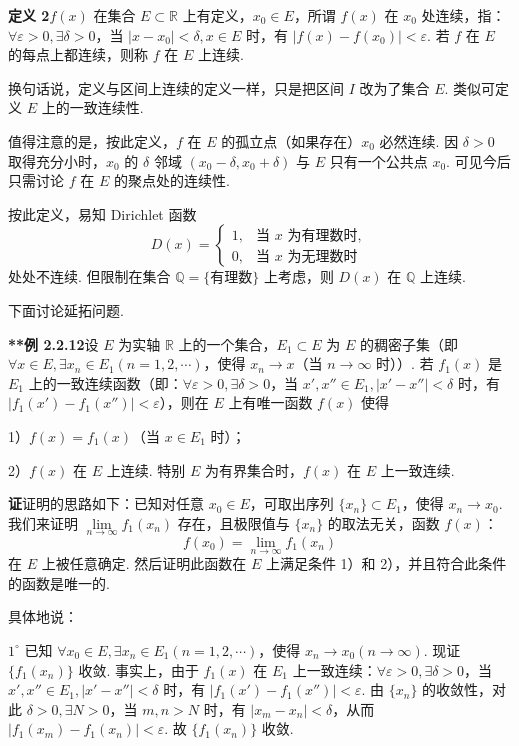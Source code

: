 \documentclass[UTF8,12pt,a4paper,fontset=fandol]{ctexart}
\begin{document}
\noindent\textbf{定义 2}\quad $f(x)$ 在集合 $E\subset\mathbb{R}$ 上有定义，$x_0\in E$，所谓 $f(x)$ 在 $x_0$ 处连续，指：$\forall\varepsilon>0,\exists\delta>0$，当 $|x-x_0|<\delta,x\in E$ 时，有 $|f(x)-f(x_0)|<\varepsilon$. 若 $f$ 在 $E$ 的每点上都连续，则称 $f$ 在 $E$ 上连续.

换句话说，定义与区间上连续的定义一样，只是把区间 $I$ 改为了集合 $E$. 类似可定义 $E$ 上的一致连续性.

值得注意的是，按此定义，$f$ 在 $E$ 的孤立点（如果存在）$x_0$ 必然连续. 因 $\delta>0$ 取得充分小时，$x_0$ 的 $\delta$ 邻域 $(x_0-\delta,x_0+\delta)$ 与 $E$ 只有一个公共点 $x_0$. 可见今后只需讨论 $f$ 在 $E$ 的聚点处的连续性.

按此定义，易知 Dirichlet 函数
\[
  D(x)=
  \begin{cases}
    1, & \text{当 }x\text{ 为有理数时},\\
    0, & \text{当 }x\text{ 为无理数时}
  \end{cases}
\]
处处不连续. 但限制在集合 $\mathbb{Q}=\{\text{有理数}\}$ 上考虑，则 $D(x)$ 在 $\mathbb{Q}$ 上连续.

下面讨论延拓问题.

\noindent\textbf{**例 2.2.12}\quad 设 $E$ 为实轴 $\mathbb{R}$ 上的一个集合，$E_1\subset E$ 为 $E$ 的稠密子集（即 $\forall x\in E,\exists x_n\in E_1(n=1,2,\cdots)$，使得 $x_n\to x$（当 $n\to\infty$ 时））. 若 $f_1(x)$ 是 $E_1$ 上的一致连续函数（即：$\forall\varepsilon>0,\exists\delta>0$，当 $x',x''\in E_1,|x'-x''|<\delta$ 时，有 $|f_1(x')-f_1(x'')|<\varepsilon$），则在 $E$ 上有唯一函数 $f(x)$ 使得

1）$f(x)=f_1(x)$（当 $x\in E_1$ 时）；

2）$f(x)$ 在 $E$ 上连续. 特别 $E$ 为有界集合时，$f(x)$ 在 $E$ 上一致连续.

\noindent\textbf{证}\quad 证明的思路如下：已知对任意 $x_0\in E$，可取出序列 $\{x_n\}\subset E_1$，使得 $x_n\to x_0$. 我们来证明 $\lim\limits_{n\to\infty}f_1(x_n)$ 存在，且极限值与 $\{x_n\}$ 的取法无关，函数 $f(x)$：
\[
  f(x_0)=\lim_{n\to\infty}f_1(x_n)
\]
在 $E$ 上被任意确定. 然后证明此函数在 $E$ 上满足条件 1）和 2），并且符合此条件的函数是唯一的.

具体地说：

$1^\circ$ 已知 $\forall x_0\in E,\exists x_n\in E_1(n=1,2,\cdots)$，使得 $x_n\to x_0(n\to\infty)$. 现证 $\{f_1(x_n)\}$ 收敛. 事实上，由于 $f_1(x)$ 在 $E_1$ 上一致连续：$\forall\varepsilon>0,\exists\delta>0$，当 $x',x''\in E_1,|x'-x''|<\delta$ 时，有 $|f_1(x')-f_1(x'')|<\varepsilon$. 由 $\{x_n\}$ 的收敛性，对此 $\delta>0,\exists N>0$，当 $m,n>N$ 时，有 $|x_m-x_n|<\delta$，从而 $|f_1(x_m)-f_1(x_n)|<\varepsilon$. 故 $\{f_1(x_n)\}$ 收敛.
\end{document}
